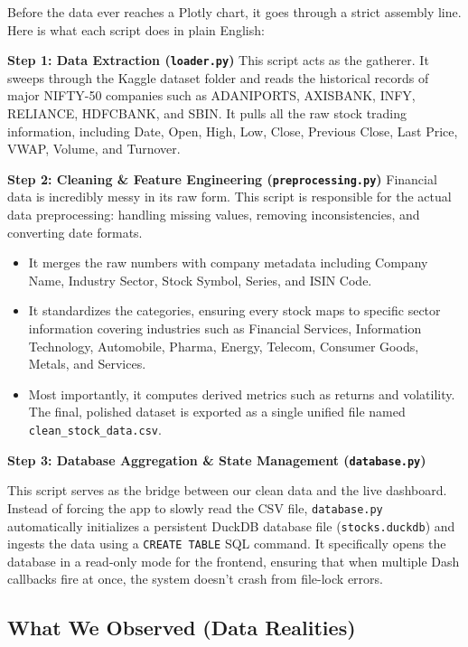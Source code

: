 \documentclass[14pt,a4paper]{extreport}
\begin{document}
Before the data ever reaches a Plotly chart, it goes through a strict
assembly line. Here is what each script does in plain English:

\noindent\textbf{Step 1: Data Extraction (\texttt{loader.py})} This script
acts as the gatherer. It sweeps through the Kaggle dataset folder and reads
the historical records of major NIFTY-50 companies such as ADANIPORTS,
AXISBANK, INFY, RELIANCE, HDFCBANK, and SBIN. It pulls all the raw stock
trading information, including Date, Open, High, Low, Close, Previous
Close, Last Price, VWAP, Volume, and Turnover.

\noindent\textbf{Step 2: Cleaning \& Feature Engineering
(\texttt{preprocessing.py})} Financial data is incredibly messy in its raw
form. This script is responsible for the actual data preprocessing:
handling missing values, removing inconsistencies, and converting date
formats.

\begin{itemize}
    \item It merges the raw numbers with company metadata including
        Company Name, Industry Sector, Stock Symbol, Series, and ISIN Code.
    \item It standardizes the categories, ensuring every stock maps to
        specific sector information covering industries such as Financial
        Services, Information Technology, Automobile, Pharma, Energy,
        Telecom, Consumer Goods, Metals, and Services.
    \item Most importantly, it computes derived metrics such as returns and
        volatility. The final, polished dataset is exported as a single
        unified file named \texttt{clean\_stock\_data.csv}.
\end{itemize}

\noindent\textbf{Step 3: Database Aggregation \& State Management
(\texttt{database.py})}

This script serves as the bridge between our clean data and the live
dashboard. Instead of forcing the app to slowly read the CSV file,
\texttt{database.py} automatically initializes a persistent DuckDB database
file (\texttt{stocks.duckdb}) and ingests the data using a
\texttt{CREATE TABLE} SQL command. It specifically opens the database in a
read-only mode for the frontend, ensuring that when multiple Dash callbacks
fire at once, the system doesn't crash from file-lock errors.

\subsection{What We Observed (Data Realities)}
\end{document}
